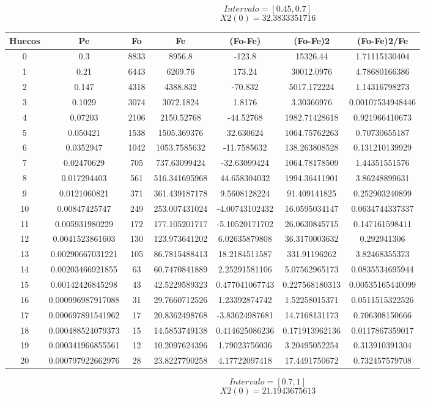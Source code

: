 \documentclass{article}
\begin{document}
$$
Intervalo = [0.45, 0.7]
$$
$$
X2(0) = 32.3833351716
$$
\begin{tabular}{|c|c|c|c|c|c|c|}
Huecos&Pe&Fo&Fe&(Fo{-}Fe)&(Fo{-}Fe)2&(Fo{-}Fe)2/Fe\\
\hline
0&0.3&8833&8956.8&{-}123.8&15326.44&1.71115130404\\
\hline
1&0.21&6443&6269.76&173.24&30012.0976&4.78680166386\\
\hline
2&0.147&4318&4388.832&{-}70.832&5017.172224&1.14316798273\\
\hline
3&0.1029&3074&3072.1824&1.8176&3.30366976&0.00107534948446\\
\hline
4&0.07203&2106&2150.52768&{-}44.52768&1982.71428618&0.921966410673\\
\hline
5&0.050421&1538&1505.369376&32.630624&1064.75762263&0.70730655187\\
\hline
6&0.0352947&1042&1053.7585632&{-}11.7585632&138.263808528&0.131210139929\\
\hline
7&0.02470629&705&737.63099424&{-}32.63099424&1064.78178509&1.44351551576\\
\hline
8&0.017294403&561&516.341695968&44.658304032&1994.36411901&3.86248899631\\
\hline
9&0.0121060821&371&361.439187178&9.5608128224&91.409141825&0.252903240899\\
\hline
10&0.00847425747&249&253.007431024&{-}4.00743102432&16.0595034147&0.0634744337337\\
\hline
11&0.005931980229&172&177.105201717&{-}5.10520171702&26.0630845715&0.147161598411\\
\hline
12&0.0041523861603&130&123.973641202&6.02635879808&36.3170003632&0.292941306\\
\hline
13&0.00290667031221&105&86.7815488413&18.2184511587&331.91196262&3.82468355373\\
\hline
14&0.00203466921855&63&60.7470841889&2.25291581106&5.07562965173&0.0835534695944\\
\hline
15&0.00142426845298&43&42.5229589323&0.477041067743&0.227568180313&0.00535165440099\\
\hline
16&0.000996987917088&31&29.7660712526&1.23392874742&1.52258015371&0.0511515322526\\
\hline
17&0.000697891541962&17&20.8362498768&{-}3.83624987681&14.7168131173&0.706308150666\\
\hline
18&0.000488524079373&15&14.5853749138&0.414625086236&0.171913962136&0.0117867359017\\
\hline
19&0.000341966855561&12&10.2097624396&1.79023756036&3.20495052254&0.313910391304\\
\hline
20&0.000797922662976&28&23.8227790258&4.17722097418&17.4491750672&0.732457579708\\
\end{tabular}
$$
Intervalo = [0.7, 1]
$$
$$
X2(0) = 21.1943675613
$$
\end{document}
